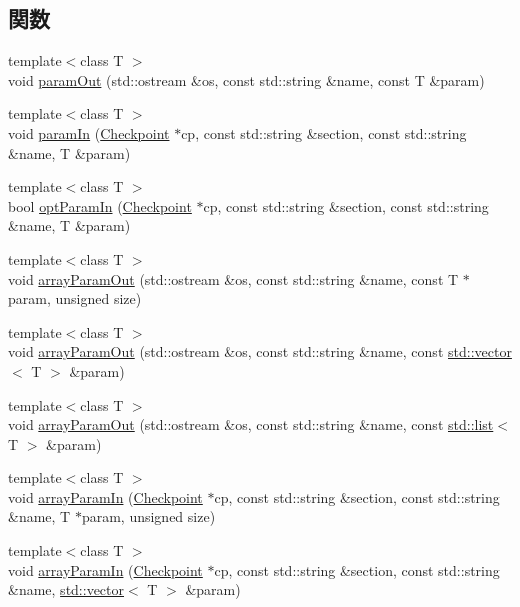 \subsection*{関数}
\begin{DoxyCompactItemize}
\item 
{\footnotesize template$<$class T $>$ }\\void \hyperlink{serialize_8hh_a01d1211675b41352b29c775179e15f2a}{paramOut} (std::ostream \&os, const std::string \&name, const T \&param)
\item 
{\footnotesize template$<$class T $>$ }\\void \hyperlink{serialize_8hh_ac6aea34b594f3d7c3e69d650e2d8e37b}{paramIn} (\hyperlink{classCheckpoint}{Checkpoint} $\ast$cp, const std::string \&section, const std::string \&name, T \&param)
\item 
{\footnotesize template$<$class T $>$ }\\bool \hyperlink{serialize_8hh_a3ba0bcb28a0cc5738908c18632babcbb}{optParamIn} (\hyperlink{classCheckpoint}{Checkpoint} $\ast$cp, const std::string \&section, const std::string \&name, T \&param)
\item 
{\footnotesize template$<$class T $>$ }\\void \hyperlink{serialize_8hh_a4406c29ae068732e0341ace268084b5e}{arrayParamOut} (std::ostream \&os, const std::string \&name, const T $\ast$param, unsigned size)
\item 
{\footnotesize template$<$class T $>$ }\\void \hyperlink{serialize_8hh_ad4c4cd1a113ab434793ff64e37e6abf5}{arrayParamOut} (std::ostream \&os, const std::string \&name, const \hyperlink{classstd_1_1vector}{std::vector}$<$ T $>$ \&param)
\item 
{\footnotesize template$<$class T $>$ }\\void \hyperlink{serialize_8hh_a654936204c92d2f02a31f2962c0525d0}{arrayParamOut} (std::ostream \&os, const std::string \&name, const \hyperlink{classstd_1_1list}{std::list}$<$ T $>$ \&param)
\item 
{\footnotesize template$<$class T $>$ }\\void \hyperlink{serialize_8hh_a6b947efbd6a4ceb6ed5a1c79898fa287}{arrayParamIn} (\hyperlink{classCheckpoint}{Checkpoint} $\ast$cp, const std::string \&section, const std::string \&name, T $\ast$param, unsigned size)
\item 
{\footnotesize template$<$class T $>$ }\\void \hyperlink{serialize_8hh_ae1d6ca928c9be8b949b8e0451032c261}{arrayParamIn} (\hyperlink{classCheckpoint}{Checkpoint} $\ast$cp, const std::string \&section, const std::string \&name, \hyperlink{classstd_1_1vector}{std::vector}$<$ T $>$ \&param)

\end{DoxyCompactItemize}
